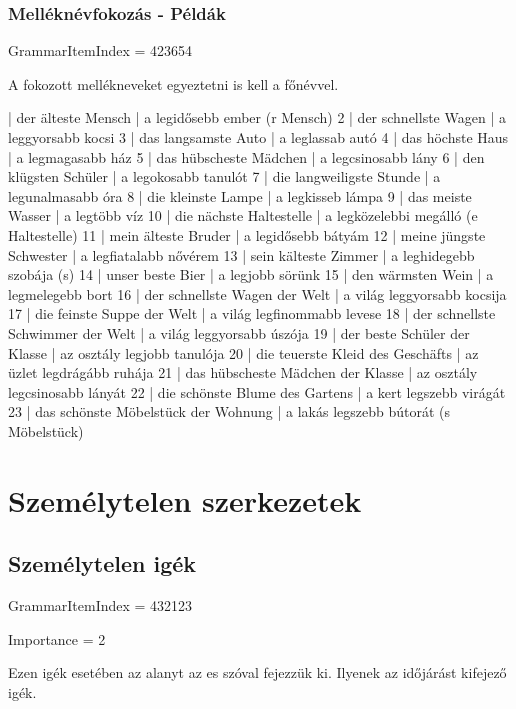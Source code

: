 \documentclass{article}
\newenvironment{desc}{\verbatim}{\endverbatim}
\newenvironment{exmp}{\verbatim}{\endverbatim}
\begin{document}
\subsubsection{Melléknévfokozás - Példák}

GrammarItemIndex = 423654

\begin{desc}
A fokozott mellékneveket egyeztetni is kell a főnévvel.
\end{desc}

\begin{exmp}
1 | der älteste Mensch | a legidősebb ember (r Mensch)
2 | der schnellste Wagen | a leggyorsabb kocsi
3 | das langsamste Auto | a leglassab autó
4 | das höchste Haus | a legmagasabb ház
5 | das hübscheste Mädchen | a legcsinosabb lány
6 | den klügsten Schüler | a legokosabb tanulót
7 | die langweiligste Stunde | a legunalmasabb óra
8 | die kleinste Lampe | a legkisseb lámpa
9 | das meiste Wasser | a legtöbb víz
10 | die nächste Haltestelle | a legközelebbi megálló (e Haltestelle)
11 | mein älteste Bruder | a legidősebb bátyám
12 | meine jüngste Schwester | a legfiatalabb nővérem
13 | sein kälteste Zimmer | a leghidegebb szobája (s)
14 | unser beste Bier | a legjobb sörünk
15 | den wärmsten Wein | a legmelegebb bort
16 | der schnellste Wagen der Welt | a világ leggyorsabb kocsija
17 | die feinste Suppe der Welt | a világ legfinommabb levese
18 | der schnellste Schwimmer der Welt | a világ leggyorsabb úszója
19 | der beste Schüler der Klasse | az osztály legjobb tanulója
20 | die teuerste Kleid des Geschäfts | az üzlet legdrágább ruhája
21 | das hübscheste Mädchen der Klasse | az osztály legcsinosabb lányát
22 | die schönste Blume des Gartens | a kert legszebb virágát
23 | das schönste Möbelstück der Wohnung | a lakás legszebb bútorát (s Möbelstück)
\end{exmp}

\section{Személytelen szerkezetek}

\subsection{Személytelen igék}

GrammarItemIndex = 432123

Importance = 2

\begin{desc}
Ezen igék esetében az alanyt az es szóval fejezzük ki. Ilyenek az időjárást kifejező igék.
\end{desc}
\end{document}
